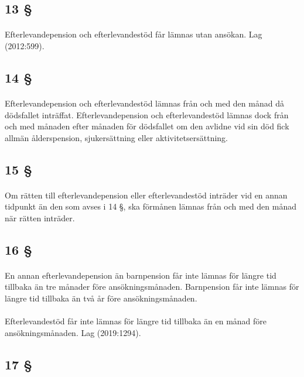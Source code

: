 \documentclass[a4paper,notitlepage,openany,10pt]{book}
\begin{document}
\subsection*{13 §}
\paragraph*{}
Efterlevandepension och efterlevandestöd får lämnas utan ansökan.
Lag (2012:599).
\subsection*{14 §}
\paragraph*{}
Efterlevandepension och efterlevandestöd lämnas från och med den månad då dödsfallet inträffat. Efterlevandepension och efterlevandestöd lämnas dock från och med månaden efter månaden för dödsfallet om den avlidne vid sin död fick allmän ålderspension, sjukersättning eller aktivitetsersättning.
\subsection*{15 §}
\paragraph*{}
Om rätten till efterlevandepension eller efterlevandestöd inträder vid en annan tidpunkt än den som avses i 14 §, ska förmånen lämnas från och med den månad när rätten inträder.
\subsection*{16 §}
\paragraph*{}
En annan efterlevandepension än barnpension får inte lämnas för längre tid tillbaka än tre månader före ansökningsmånaden. Barnpension får inte lämnas för längre tid tillbaka än två år före ansökningsmånaden.
\paragraph*{}
Efterlevandestöd får inte lämnas för längre tid tillbaka än en månad före ansökningsmånaden.
Lag (2019:1294).
\subsection*{17 §}
\end{document}
